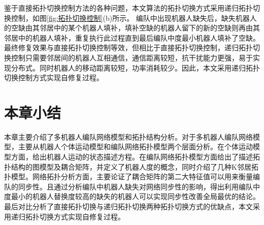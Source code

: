 鉴于直接拓扑切换控制方法的各种问题，本文算法的拓扑切换方式采用递归拓扑切换控制，如图\ref{fig:拓扑切换控制}(b)所示。
编队中出现机器人缺失后，缺失机器人的空缺由其邻居中的某个机器人填补，填补空缺的机器人留下的新的空缺则再由其邻居中的机器人填补，重复执行此过程直到最后编队中度最小机器人填补了空缺。最终修复效果与直接拓扑切换控制等效，但相比于直接拓扑切换控制，递归拓扑切换控制只需要邻居间的机器人互相通信，通信距离较短，抗干扰能力更强，易于实现分布式。同时机器人的移动距离较短，功率消耗较少。因此，本文采用递归拓扑切换控制方式实现自修复过程。

\section{本章小结}
本章主要介绍了多机器人编队网络模型和拓扑结构分析。对于多机器人编队网络模型，主要从机器人个体运动模型和编队网络拓扑模型两个层面分析。在个体运动模型方面，给出机器人运动的状态描述方程。在编队网络拓扑模型方面给出了描述拓扑结构的图模型及耦合矩阵，并定义了机器人度的概念，同时介绍了几种K邻居拓扑模型。网络拓扑分析方面，主要论证了耦合矩阵的第二大特征值可以用来衡量编队的同步性。且通过分析编队中机器人缺失对网络同步性的影响，得出利用编队中度最小的机器人替换度较高的缺失的机器人可以实现同步性改善全局最优的结论。最后对比分析了直接拓扑切换与递归拓扑切换两种拓扑切换方式的优缺点，本文采用递归拓扑切换方式实现自修复过程。